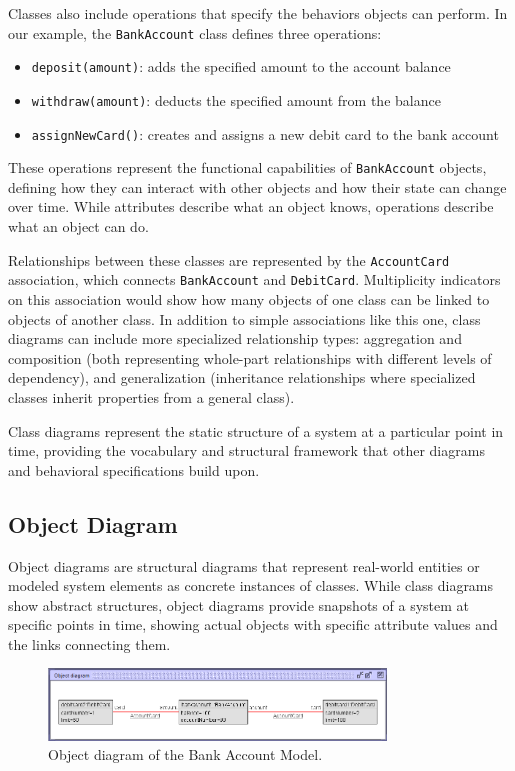 Classes also include operations that specify the behaviors objects can perform. 
In our example, the \texttt{BankAccount} class defines three operations:
\begin{itemize}
    \item \texttt{deposit(amount)}: adds the specified amount to the account balance
    \item \texttt{withdraw(amount)}: deducts the specified amount from the balance
    \item \texttt{assignNewCard()}: creates and assigns a new debit card to the bank account
\end{itemize}

These operations represent the functional capabilities of \texttt{BankAccount} objects, 
defining how they can interact with other objects and how their state can change over 
time. While attributes describe what an object knows, operations describe what an 
object can do.

Relationships between these classes are represented by the \texttt{AccountCard} 
association, which connects \texttt{BankAccount} and \texttt{DebitCard}. 
Multiplicity indicators on this association would show how many objects of one class 
can be linked to objects of another class. In addition to simple associations like 
this one, class diagrams can include more specialized relationship types: aggregation 
and composition (both representing whole-part relationships with different levels of 
dependency), and generalization (inheritance relationships where specialized classes 
inherit properties from a general class).

Class diagrams represent the static structure of a system at a particular point in 
time, providing the vocabulary and structural framework that other diagrams and 
behavioral specifications build upon.


\subsection{Object Diagram}
\hspace{1cm} Object diagrams are structural diagrams that represent real-world entities or 
modeled system elements as concrete instances of classes. While class diagrams 
show abstract structures, object diagrams provide snapshots of a system at specific 
points in time, showing actual objects with specific attribute values and the links 
connecting them.

\begin{figure}
    \begin{center}
        \includegraphics[width=0.8\textwidth]{figures/c1/BankAccount/BA_ObjectDiagram.png}
        \caption{Object diagram of the Bank Account Model.}
        \label{fig:object_diagram_bank_account_model}
    \end{center}
\end{figure}

